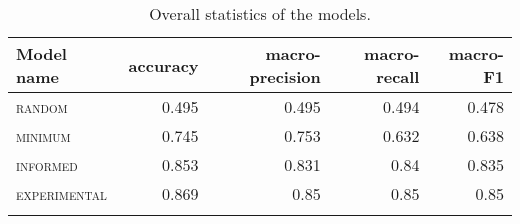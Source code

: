 \begin{table}
\begin{tabular}{lrrrr}
	\lsptoprule
	Model name & accuracy %
	& macro-precision & macro-recall & macro-F1 \\ 
	\midrule
	\textsc{random} &  0.495 %
	& 0.495 & 0.494 & 0.478 \\ 
	\textsc{minimum} & 0.745 %
	& 0.753 & 0.632 & 0.638 \\ 
	\textsc{informed} & 0.853 %
	& 0.831 & 0.84 & 0.835 \\ 
	\textsc{experimental} & 0.869 %
	& 0.85 & 0.85 & 0.85 \\ 
	\lspbottomrule
\end{tabular}
\caption{Overall statistics of the models.} 
\label{tab:overalStat}
\end{table}
